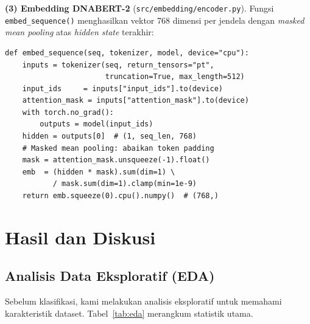 \documentclass{article}
\begin{document}
\textbf{(3) Embedding DNABERT-2} (\texttt{src/embedding/encoder.py}).
Fungsi \texttt{embed\_sequence()} menghasilkan vektor 768 dimensi per jendela
dengan \textit{masked mean pooling} atas \textit{hidden state} terakhir:

\begin{lstlisting}[caption={Encoding satu jendela DNA dengan DNABERT-2.}]
def embed_sequence(seq, tokenizer, model, device="cpu"):
    inputs = tokenizer(seq, return_tensors="pt",
                       truncation=True, max_length=512)
    input_ids     = inputs["input_ids"].to(device)
    attention_mask = inputs["attention_mask"].to(device)
    with torch.no_grad():
        outputs = model(input_ids)
    hidden = outputs[0]  # (1, seq_len, 768)
    # Masked mean pooling: abaikan token padding
    mask = attention_mask.unsqueeze(-1).float()
    emb  = (hidden * mask).sum(dim=1) \
           / mask.sum(dim=1).clamp(min=1e-9)
    return emb.squeeze(0).cpu().numpy()  # (768,)
\end{lstlisting}

\section{Hasil dan Diskusi}
\label{sec:hasil}

\subsection{Analisis Data Eksploratif (EDA)}

Sebelum klasifikasi, kami melakukan analisis eksploratif untuk memahami
karakteristik dataset. Tabel~\ref{tab:eda} merangkum statistik utama.
\end{document}
